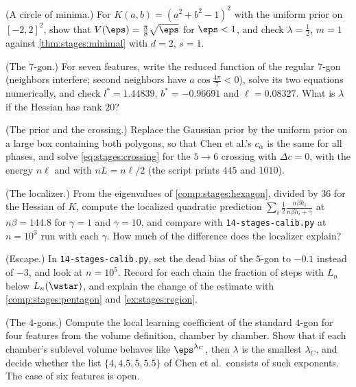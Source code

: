 \begin{refsection}
\begin{exercises}
\item \byhand (A circle of minima.) For $K(a,b)=(a^2+b^2-1)^2$ with the uniform prior on $[-2,2]^2$, show that $V(\eps)=\frac\pi8\sqrt\eps$ for $\eps<1$, and check $\lambda=\frac12$, $m=1$ against \cref{thm:stages:minimal} with $d=2$, $s=1$.\label{ex:stages:circle}

\item \byhand (The $7$-gon.) For seven features, write the reduced function of the regular $7$-gon (neighbors interfere; second neighbors have $a\cos\frac{4\pi}7<0$), solve its two equations numerically, and check $l^*=1.44839$, $b^*=-0.96691$ and $\ell=0.08327$. What is $\lambda$ if the Hessian has rank $20$?\label{ex:stages:heptagon}

\item \variation (The prior and the crossing.) Replace the Gaussian prior by the uniform prior on a large box containing both polygons, so that Chen et al.'s $c_\alpha$ is the same for all phases, and solve \eqref{eq:stages:crossing} for the $5\to6$ crossing with $\Delta c=0$, with the energy $n\ell$ and with $nL=n\ell/2$ (the script prints $445$ and $1010$).\label{ex:stages:prior}

\item \measurement (The localizer.) From the eigenvalues of \cref{comp:stages:hexagon}, divided by $36$ for the Hessian of $K$, compute the localized quadratic prediction $\sum_i\frac12\frac{n\beta h_i}{n\beta h_i+\gamma}$ at $n\beta=144.8$ for $\gamma=1$ and $\gamma=10$, and compare with \texttt{14-stages-calib.py} at $n=10^3$ run with each $\gamma$. How much of the difference does the localizer explain?\label{ex:stages:localizer}

\item \measurement (Escape.) In \texttt{14-stages-calib.py}, set the dead bias of the $5$-gon to $-0.1$ instead of $-3$, and look at $n=10^5$. Record for each chain the fraction of steps with $L_n$ below $L_n(\wstar)$, and explain the change of the estimate with \cref{comp:stages:pentagon} and \cref{ex:stages:region}.\label{ex:stages:escape}

\item \research (The $4$-gons.) Compute the local learning coefficient of the standard $4$-gon for four features from the volume definition, chamber by chamber. Show that if each chamber's sublevel volume behaves like $\eps^{\lambda_C}$, then $\lambda$ is the smallest $\lambda_C$, and decide whether the list $\{4,4.5,5,5.5\}$ of Chen et al.\ consists of such exponents. The case of six features is open.\label{ex:stages:research4}
\end{exercises}


\end{refsection}
